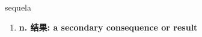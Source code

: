 
\begin{frame}
{\huge sequela}
\begin{center}
\begin{enumerate}\Large
  \item \textbf{n. 结果: a secondary consequence or result}
\end{enumerate}
\end{center}
\end{frame}
